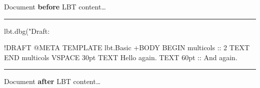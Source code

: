 \documentclass[a4paper,11pt]{article}
\begin{document}
  \lbtDebugModeOn{}

  Document \textbf{before} LBT content\dots

  \noindent\rule{\textwidth}{0.5pt}

  \begin{luacode*}
    lbt.dbg("Draft: %
  \end{luacode*}

  \begin{lbt}
    !DRAFT
    @META
      TEMPLATE lbt.Basic
    +BODY
      BEGIN multicols :: 2
      TEXT \lipsum[1-5]
      END multicols
      VSPACE 30pt
      TEXT Hello again.
      TEXT 60pt :: And again.
  \end{lbt}

  \noindent\rule{\textwidth}{0.5pt}

  Document \textbf{after} LBT content\dots
\end{document}
